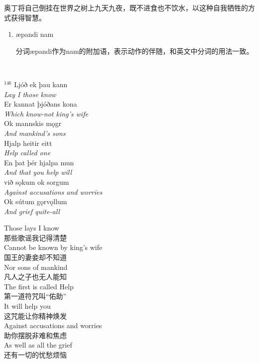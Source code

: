 \begin{grammar*}{}
    奥丁将自己倒挂在世界之树上九天九夜，既不进食也不饮水，以这种自我牺牲的方式获得智慧。
    \begin{enumerate}[leftmargin=*]

        \item æpandi nam

              分词æpandi作为nam的附加语，表示动作的伴随，和英文中分词的用法一致。

    \end{enumerate}
\end{grammar*}
\hspace*{\fill}\\ %
\begin{paracol}{2}
    \noindent
    $^{146}$ Ljóð ek þau kann\\
    \textit{Lay I those know}\\
    Er kannat þjóðans kona\\
    \textit{Which know-not king's wife}\\
    Ok mannskis mǫgr\\
    \textit{And mankind's sons}\\
    Hjalp heitir eitt\\
    \textit{Help called one}\\
    En þat þér hjalpa mun\\
    \textit{And that you help will}\\
    við sǫkum ok sorgum\\
    \textit{Against accusations and worries}\\
    Ok sútum gǫrvǫllum\\
    \textit{And grief quite-all}\\
    \switchcolumn

    \noindent
    Those lays I know\\
    那些歌谣我记得清楚\\
    Cannot be known by king's wife\\
    国王的妻妾却不知道\\
    Nor sons of mankind\\
    凡人之子也无人能知\\
    The first is called Help\\
    第一道符咒叫“佑助”\\
    It will help you\\
    这咒能让你精神焕发\\
    Against accusations and worries\\
    助你摆脱非难和焦虑\\
    As well as all the grief\\
    还有一切的忧愁烦恼\\
\end{paracol}

